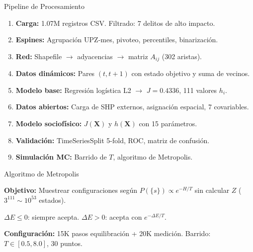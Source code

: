 \documentclass[11pt]{beamer}
\begin{document}
\begin{frame}{Pipeline de Procesamiento}

\begin{enumerate}
    \item \textbf{Carga:} 1.07M registros CSV. Filtrado: 7 delitos de alto impacto.
    \item \textbf{Espines:} Agrupación UPZ-mes, pivoteo, percentiles, binarización.
    \item \textbf{Red:} Shapefile $\to$ adyacencias $\to$ matriz $A_{ij}$ (302 aristas).
    \item \textbf{Datos dinámicos:} Pares $(t, t+1)$ con estado objetivo y suma de vecinos.
    \item \textbf{Modelo base:} Regresión logística L2 $\to$ $J=0.4336$, 111 valores $h_i$.
    \item \textbf{Datos abiertos:} Carga de SHP externos, asignación espacial, 7 covariables.
    \item \textbf{Modelo sociofísico:} $J(\mathbf{X})$ y $h(\mathbf{X})$ con 15 parámetros.
    \item \textbf{Validación:} TimeSeriesSplit 5-fold, ROC, matriz de confusión.
    \item \textbf{Simulación MC:} Barrido de $T$, algoritmo de Metropolis.
\end{enumerate}
\end{frame}

\begin{frame}{Algoritmo de Metropolis}

\textbf{Objetivo:} Muestrear configuraciones según $P(\{s\}) \propto e^{-H/T}$ sin calcular $Z$ ($3^{111} \sim 10^{53}$ estados).

\vspace{0.3cm}
\begin{center}
\end{center}

\vspace{0.2cm}
$\Delta E \leq 0$: siempre acepta. $\Delta E > 0$: acepta con $e^{-\Delta E/T}$.

\vspace{0.2cm}
\textbf{Configuración:} 15K pasos equilibración + 20K medición. Barrido: $T \in [0.5, 8.0]$, 30 puntos.
\end{frame}
\end{document}
